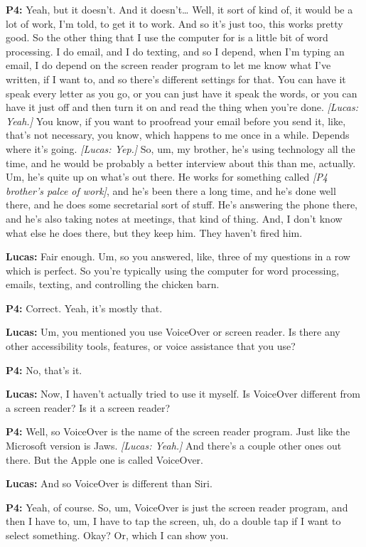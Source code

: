 \textbf{P4:} Yeah, but it doesn't. And it doesn't\ldots{} Well, it sort of kind of, it would be a lot of work, I'm told, to get it to work. And so it's just too, this works pretty good. So the other thing that I use the computer for is a little bit of word processing. I do email, and I do texting, and so I depend, when I'm typing an email, I do depend on the screen reader program to let me know what I've written, if I want to, and so there's different settings for that. You can have it speak every letter as you go, or you can just have it speak the words, or you can have it just off and then turn it on and read the thing when you're done. \textit{[Lucas: Yeah.]} You know, if you want to proofread your email before you send it, like, that's not necessary, you know, which happens to me once in a while. Depends where it's going. \textit{[Lucas: Yep.]} So, um, my brother, he's using technology all the time, and he would be probably a better interview about this than me, actually. Um, he's quite up on what's out there. He works for something called \textit{[P4 brother's palce of work]}, and he's been there a long time, and he's done well there, and he does some secretarial sort of stuff. He's answering the phone there, and he's also taking notes at meetings, that kind of thing. And, I don't know what else he does there, but they keep him. They haven't fired him.

\textbf{Lucas:} Fair enough. Um, so you answered, like, three of my questions in a row which is perfect. So you're typically using the computer for word processing, emails, texting, and controlling the chicken barn.

\textbf{P4:} Correct. Yeah, it's mostly that.

\textbf{Lucas:} Um, you mentioned you use VoiceOver or screen reader. Is there any other accessibility tools, features, or voice assistance that you use?

\textbf{P4:} No, that's it.

\textbf{Lucas:} Now, I haven't actually tried to use it myself. Is VoiceOver different from a screen reader? Is it a screen reader?

\textbf{P4:} Well, so VoiceOver is the name of the screen reader program. Just like the Microsoft version is Jaws. \textit{[Lucas: Yeah.]} And there's a couple other ones out there. But the Apple one is called VoiceOver.

\textbf{Lucas:} And so VoiceOver is different than Siri.

\textbf{P4:} Yeah, of course. So, um, VoiceOver is just the screen reader program, and then I have to, um, I have to tap the screen, uh, do a double tap if I want to select something. Okay? Or, which I can show you.

